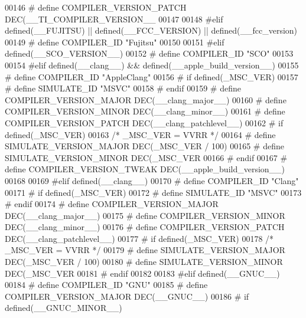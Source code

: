 \begin{DoxyCode}
{{{{{{{{{{{{{{{{{{{{{00146 \textcolor{preprocessor}{# define COMPILER\_VERSION\_PATCH DEC(\_\_TI\_COMPILER\_VERSION\_\_        %
00147 
00148 \textcolor{preprocessor}{#elif defined(\_\_FUJITSU) || defined(\_\_FCC\_VERSION) || defined(\_\_fcc\_version)}
00149 \textcolor{preprocessor}{# define COMPILER\_ID "Fujitsu"}
00150 
00151 \textcolor{preprocessor}{#elif defined(\_\_SCO\_VERSION\_\_)}
00152 \textcolor{preprocessor}{# define COMPILER\_ID "SCO"}
00153 
00154 \textcolor{preprocessor}{#elif defined(\_\_clang\_\_) && defined(\_\_apple\_build\_version\_\_)}
00155 \textcolor{preprocessor}{# define COMPILER\_ID "AppleClang"}
00156 \textcolor{preprocessor}{# if defined(\_MSC\_VER)}
00157 \textcolor{preprocessor}{#  define SIMULATE\_ID "MSVC"}
00158 \textcolor{preprocessor}{# endif}
00159 \textcolor{preprocessor}{# define COMPILER\_VERSION\_MAJOR DEC(\_\_clang\_major\_\_)}
00160 \textcolor{preprocessor}{# define COMPILER\_VERSION\_MINOR DEC(\_\_clang\_minor\_\_)}
00161 \textcolor{preprocessor}{# define COMPILER\_VERSION\_PATCH DEC(\_\_clang\_patchlevel\_\_)}
00162 \textcolor{preprocessor}{# if defined(\_MSC\_VER)}
00163    \textcolor{comment}{/* \_MSC\_VER = VVRR */}
00164 \textcolor{preprocessor}{#  define SIMULATE\_VERSION\_MAJOR DEC(\_MSC\_VER / 100)}
00165 \textcolor{preprocessor}{#  define SIMULATE\_VERSION\_MINOR DEC(\_MSC\_VER %
00166 \textcolor{preprocessor}{# endif}
00167 \textcolor{preprocessor}{# define COMPILER\_VERSION\_TWEAK DEC(\_\_apple\_build\_version\_\_)}
00168 
00169 \textcolor{preprocessor}{#elif defined(\_\_clang\_\_)}
00170 \textcolor{preprocessor}{# define COMPILER\_ID "Clang"}
00171 \textcolor{preprocessor}{# if defined(\_MSC\_VER)}
00172 \textcolor{preprocessor}{#  define SIMULATE\_ID "MSVC"}
00173 \textcolor{preprocessor}{# endif}
00174 \textcolor{preprocessor}{# define COMPILER\_VERSION\_MAJOR DEC(\_\_clang\_major\_\_)}
00175 \textcolor{preprocessor}{# define COMPILER\_VERSION\_MINOR DEC(\_\_clang\_minor\_\_)}
00176 \textcolor{preprocessor}{# define COMPILER\_VERSION\_PATCH DEC(\_\_clang\_patchlevel\_\_)}
00177 \textcolor{preprocessor}{# if defined(\_MSC\_VER)}
00178    \textcolor{comment}{/* \_MSC\_VER = VVRR */}
00179 \textcolor{preprocessor}{#  define SIMULATE\_VERSION\_MAJOR DEC(\_MSC\_VER / 100)}
00180 \textcolor{preprocessor}{#  define SIMULATE\_VERSION\_MINOR DEC(\_MSC\_VER %
00181 \textcolor{preprocessor}{# endif}
00182 
00183 \textcolor{preprocessor}{#elif defined(\_\_GNUC\_\_)}
00184 \textcolor{preprocessor}{# define COMPILER\_ID "GNU"}
00185 \textcolor{preprocessor}{# define COMPILER\_VERSION\_MAJOR DEC(\_\_GNUC\_\_)}
00186 \textcolor{preprocessor}{# if defined(\_\_GNUC\_MINOR\_\_)}
}}}}}}}}}}}}}}}}}}}}}}}}
\end{DoxyCode}

